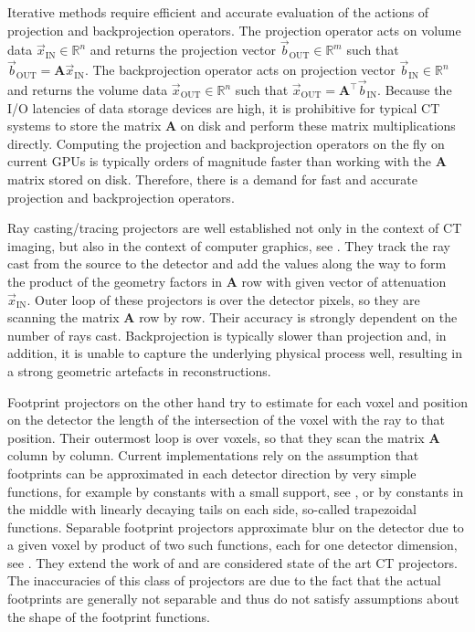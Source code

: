 Iterative methods require efficient and accurate evaluation of the actions of projection and backprojection operators. The projection operator acts on volume data $\vec{x}_{\mathrm{IN}} \in \mathbb{R}^n$  and returns the projection vector $\vec{b}_{\mathrm{OUT}} \in \mathbb{R}^m$ such that $\vec{b}_{\mathrm{OUT}} = \mathbf{A} \vec{x}_{\mathrm{IN}}$. The backprojection operator acts on projection vector $\vec{b}_{\mathrm{IN}} \in \mathbb{R}^n$ and returns the volume data $\vec{x}_{\mathrm{OUT}} \in \mathbb{R}^n$ such that $\vec{x}_{\mathrm{OUT}} = \mathbf{A}^\top \vec{b}_{\mathrm{IN}}$. Because the I/O latencies of data storage devices are high, it is prohibitive for typical CT systems to store the matrix $\mathbf{A}$ on disk and perform these matrix multiplications directly. Computing the projection and backprojection operators on the fly on current GPUs is typically orders of magnitude faster than working with the $\mathbf{A}$ matrix stored on disk. Therefore, there is a demand for fast and accurate projection and backprojection operators.

Ray casting/tracing projectors are well established not only in the context of CT imaging, but also in the context of computer graphics, see \cite{Siddon1985,Sramek2000,Zhao2003}. They track the ray cast from the source to the detector and add the values along the way to form the product of the geometry factors in $\mathbf{A}$ row with given vector of attenuation $\vec{x}_{\mathrm{IN}}$. Outer loop of these projectors is over the detector pixels, so they are scanning the matrix $\mathbf{A}$ row by row. Their accuracy is strongly dependent on the number of rays cast. Backprojection is typically slower than projection and, in addition, it is unable to capture the underlying physical process well, resulting in a strong geometric artefacts in reconstructions.

Footprint projectors on the other hand try to estimate for each voxel and position on the detector the length of the intersection of the voxel with the ray to that position. Their outermost loop is over voxels, so that they scan the matrix $\mathbf{A}$ column by column. Current implementations rely on the assumption that footprints can be approximated in each detector direction by very simple functions, for example by constants with a small support, see \cite{Man2004}, or by constants in the middle with linearly decaying tails on each side, so-called trapezoidal functions. Separable footprint projectors approximate blur on the detector due to a given voxel by product of two such functions, each for one detector dimension, see \cite{Long2010}. They extend the work of \cite{Man2004} and are considered state of the art CT projectors. The inaccuracies of this class of projectors are due to the fact that the actual footprints are generally not separable and thus do not satisfy assumptions about the shape of the footprint functions.

